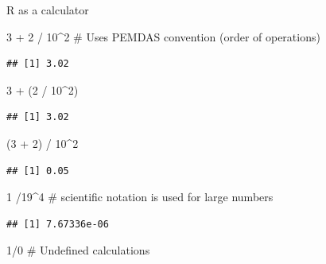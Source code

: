 \documentclass[
  10pt,
  ignorenonframetext,
]{beamer}
\newenvironment{Shaded}{\begin{snugshade}}{\end{snugshade}}
\newcommand{\CommentTok}[1]{\textcolor[rgb]{0.50,0.62,0.50}{#1}}
\newcommand{\DecValTok}[1]{\textcolor[rgb]{0.86,0.86,0.80}{#1}}
\newcommand{\NormalTok}[1]{\textcolor[rgb]{0.80,0.80,0.80}{#1}}
\newcommand{\OperatorTok}[1]{\textcolor[rgb]{0.94,0.94,0.82}{#1}}
\newcommand{\StringTok}[1]{\textcolor[rgb]{0.80,0.58,0.58}{#1}}
\begin{document}
\begin{frame}[fragile]{R as a calculator}
\protect\hypertarget{r-as-a-calculator}{}

\begin{Shaded}
\begin{Highlighting}[]
\DecValTok{3} \OperatorTok{+}\StringTok{ }\DecValTok{2} \OperatorTok{/}\StringTok{ }\DecValTok{10}\OperatorTok{^}\DecValTok{2} \CommentTok{# Uses PEMDAS convention (order of operations)}
\end{Highlighting}
\end{Shaded}

\begin{verbatim}
## [1] 3.02
\end{verbatim}

\begin{Shaded}
\begin{Highlighting}[]
\DecValTok{3} \OperatorTok{+}\StringTok{ }\NormalTok{(}\DecValTok{2} \OperatorTok{/}\StringTok{ }\DecValTok{10}\OperatorTok{^}\DecValTok{2}\NormalTok{)}
\end{Highlighting}
\end{Shaded}

\begin{verbatim}
## [1] 3.02
\end{verbatim}

\begin{Shaded}
\begin{Highlighting}[]
\NormalTok{(}\DecValTok{3} \OperatorTok{+}\StringTok{ }\DecValTok{2}\NormalTok{) }\OperatorTok{/}\StringTok{ }\DecValTok{10}\OperatorTok{^}\DecValTok{2}
\end{Highlighting}
\end{Shaded}

\begin{verbatim}
## [1] 0.05
\end{verbatim}

\begin{Shaded}
\begin{Highlighting}[]
\DecValTok{1} \OperatorTok{/}\DecValTok{19}\OperatorTok{^}\DecValTok{4} \CommentTok{# scientific notation is used for large numbers}
\end{Highlighting}
\end{Shaded}

\begin{verbatim}
## [1] 7.67336e-06
\end{verbatim}

\begin{Shaded}
\begin{Highlighting}[]
\DecValTok{1}\OperatorTok{/}\DecValTok{0} \CommentTok{# Undefined calculations}
\end{Highlighting}
\end{Shaded}


\end{frame}
\end{document}
